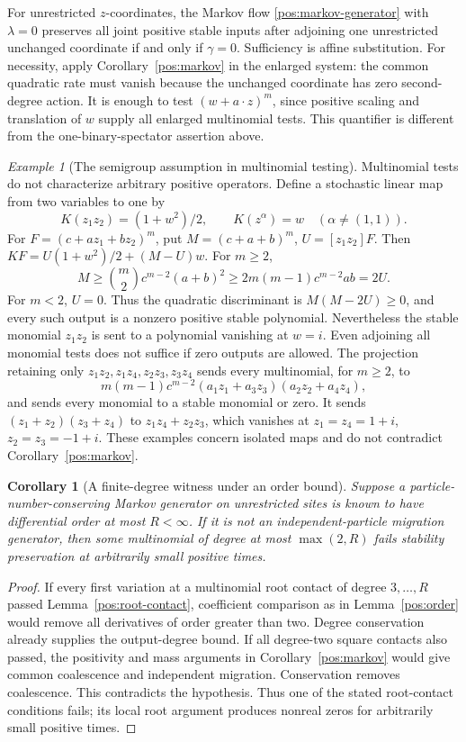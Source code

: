 \documentclass[reqno]{amsart}
\newtheorem{corollary}[theorem]{Corollary}
\theoremstyle{definition}
\theoremstyle{remark}
\newtheorem{example}[theorem]{Example}
\begin{document}
For unrestricted \(z\)-coordinates, the Markov flow
\eqref{pos:markov-generator} with \(\lambda=0\) preserves all joint positive
stable inputs after adjoining one unrestricted unchanged coordinate if and only
if \(\gamma=0\).  Sufficiency is affine substitution.  For necessity, apply
Corollary~\ref{pos:markov} in the enlarged system: the common quadratic rate
must vanish because the unchanged coordinate has zero second-degree action.
It is enough to test \((w+a\cdot z)^m\), since positive scaling and translation
of \(w\) supply all enlarged multinomial tests.
This quantifier is different from the one-binary-spectator assertion above.


\begin{example}[The semigroup assumption in multinomial testing]\label{pos:isolated-tests}
Multinomial tests do not characterize arbitrary positive operators.
Define a stochastic linear map from two variables to one by
\[
 K(z_1z_2)=(1+w^2)/2,\qquad K(z^\alpha)=w\quad(\alpha\ne(1,1)).
\]
For \(F=(c+az_1+bz_2)^m\), put \(M=(c+a+b)^m\),
\(U=[z_1z_2]F\).  Then
\(KF=U(1+w^2)/2+(M-U)w\).
For \(m\ge2\),
\[
 M\ge\binom m2c^{m-2}(a+b)^2
 \ge 2m(m-1)c^{m-2}ab=2U.
\]
For \(m<2\), \(U=0\).  Thus the quadratic discriminant is
\(M(M-2U)\ge0\), and every such output is a nonzero positive stable polynomial.
Nevertheless the stable monomial \(z_1z_2\) is sent to a polynomial vanishing at
\(w=i\).
Even adjoining all monomial tests does not suffice if zero outputs are allowed.
The projection retaining only
\(z_1z_2,z_1z_4,z_2z_3,z_3z_4\) sends every multinomial, for \(m\ge2\), to
\[
 m(m-1)c^{m-2}(a_1z_1+a_3z_3)(a_2z_2+a_4z_4),
\]
and sends every monomial to a stable monomial or zero.
It sends \((z_1+z_2)(z_3+z_4)\) to \(z_1z_4+z_2z_3\), which vanishes at
\(z_1=z_4=1+i\), \(z_2=z_3=-1+i\).
These examples concern isolated maps and do not contradict
Corollary~\ref{pos:markov}.
\end{example}


\begin{corollary}[A finite-degree witness under an order bound]\label{pos:finite-witness}
Suppose a particle-number-conserving Markov generator on unrestricted sites is
known to have differential order at most \(R<\infty\).  If it is not an
independent-particle migration generator, then some multinomial of degree at
most \(\max(2,R)\) fails stability preservation at arbitrarily small positive
times.
\end{corollary}
\begin{proof}
If every first variation at a multinomial root contact of degree
\(3,\ldots,R\) passed Lemma~\ref{pos:root-contact}, coefficient comparison as
in Lemma~\ref{pos:order} would remove all derivatives of order greater than two.
Degree conservation already supplies the output-degree bound.
If all degree-two square contacts also passed, the positivity and mass arguments
in Corollary~\ref{pos:markov} would give common coalescence and independent
migration.  Conservation removes coalescence.  This contradicts the hypothesis.
Thus one of the stated root-contact conditions fails; its local root argument
produces nonreal zeros for arbitrarily small positive times.
\end{proof}
\end{document}
